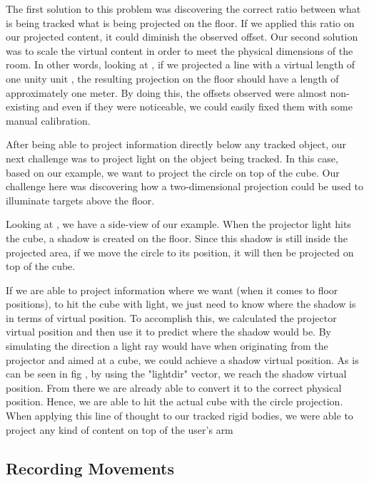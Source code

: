 The first solution to this problem was discovering the correct ratio between what is being tracked what is being projected on the floor. 
If we applied this ratio on our projected content, it could diminish the observed offset. 
Our second solution was to scale the virtual content in order to meet the physical dimensions of the room. 
In other words, looking at , if we projected a line with a virtual length of one unity unit , the resulting projection on the floor should have a length of approximately one meter.
By doing this, the offsets observed were almost non-existing and even if they were noticeable, we could easily fixed them with some manual calibration.


After being able to project information directly below any tracked object, our next challenge was to project light on the object being tracked. 
In this case, based on our example, we want to project the circle on top of the cube. 
Our challenge here was discovering how a two-dimensional projection could be used to illuminate targets above the floor.



Looking at , we have a side-view of our example. When the projector light hits the cube, a shadow is created on the floor. 
Since this shadow is still inside the projected area, if we move the circle to its position, it will then be projected on top of the cube.

If we are able to project information where we want (when it comes to floor positions), to hit the cube with light, we just need to know where the shadow is in terms of virtual position. 
To accomplish this, we calculated the projector virtual position and then use it to predict where the shadow would be. 
By simulating the direction a light ray would have when originating from the projector and aimed at a cube, we could achieve a shadow virtual position. 
As is can be seen in fig , by using the "lightdir" vector, we reach the shadow virtual position. 
From there we are already able to convert it to the correct physical position. Hence, we are able to hit the actual cube with the circle projection.
When applying this line of thought to our tracked rigid bodies, we were able to project any kind of content on top of the user's arm

\subsection{Recording Movements}

